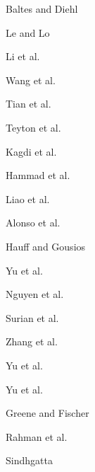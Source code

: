         Baltes and Diehl \cite{baltes2018towards}

        Le and Lo \cite{le2015beyond}
        
        Li et al. \cite{li2019distinguishes}
        
        Wang et al. \cite{wang2018survey}
        
        Tian et al. \cite{tian2019geek}
        
        Teyton et al. \cite{teyton2013find}
        
        Kagdi et al. \cite{kagdi2012assigning}
        
        Hammad et al. \cite{hammad2013identifying}
        
        Liao et al. \cite{liao2017devrank}
        
        Alonso et al. \cite{alonso2008expertise}
        
        Hauff and Gousios \cite{hauff2015matching}

        Yu et al. \cite{yu2014reviewer}
    
        Nguyen et al. \cite{nguyen2012inferring}
        
        Surian et al. \cite{surian2011recommending}
        
        Zhang et al. \cite{zhang2014recommending}
    
        Yu et al. \cite{yu2014reviewer}
        
        Yu et al. \cite{yu2016reviewer}
    
        Greene and Fischer \cite{greene2016cvexplorer}
    
        Rahman et al. \cite{rahman2016correct}
    
        Sindhgatta \cite{sindhgatta2008identifying}
    
   
    
    